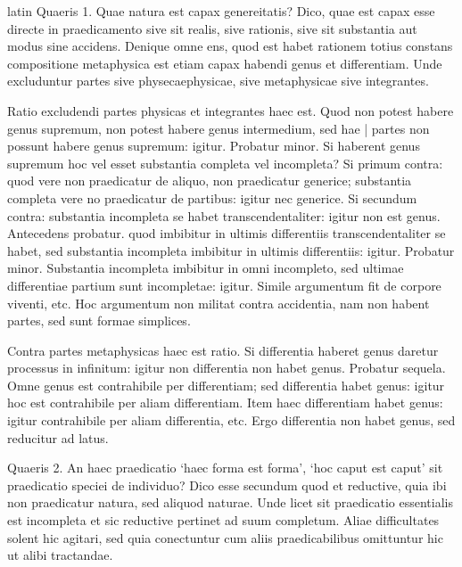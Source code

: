 \begin{otherlanguage*}{latin}
\pstart
Quaeris 1. Quae natura est capax genereitatis? Dico, quae est capax esse directe in praedicamento sive sit realis, sive rationis, sive sit substantia aut modus sine accidens. Denique omne ens, quod est habet rationem totius constans compositione metaphysica est etiam capax habendi genus et differentiam. Unde excluduntur partes sive physecaephysicae, sive metaphysicae sive integrantes. 
\pend

\pstart
Ratio excludendi partes physicas et integrantes haec est. Quod non potest habere genus supremum, non potest habere genus intermedium, sed hae \textnormal{|} partes non possunt habere genus supremum:
igitur. Probatur minor. Si haberent genus supremum hoc vel esset substantia completa vel incompleta? Si primum contra:
quod vere non praedicatur de aliquo, non praedicatur generice; substantia completa vere no praedicatur de partibus:
igitur nec generice. Si secundum contra:
substantia incompleta se habet transcendentaliter:
igitur non est genus. Antecedens probatur. quod imbibitur in ultimis differentiis transcendentaliter se habet, sed substantia incompleta imbibitur in ultimis differentiis:
igitur. Probatur minor. Substantia incompleta imbibitur in omni incompleto, sed ultimae differentiae partium sunt incompletae:
igitur. Simile argumentum fit de corpore viventi, etc. Hoc argumentum non militat contra accidentia, nam non habent partes, sed sunt formae simplices. 
\pend

\pstart
Contra partes metaphysicas haec est ratio. Si differentia haberet genus daretur processus in infinitum:
igitur non differentia non habet genus. Probatur sequela. Omne genus est contrahibile per differentiam; sed differentia habet genus:
igitur hoc est contrahibile per aliam differentiam. Item haec differentiam habet genus:
igitur contrahibile per aliam differentia, etc. Ergo differentia non habet genus, sed reducitur ad latus. 
\pend

\pstart
Quaeris 2. An haec praedicatio `haec forma est forma', `hoc caput est caput' sit praedicatio speciei de individuo? Dico esse secundum quod et reductive, quia ibi non praedicatur natura, sed aliquod naturae. Unde licet sit praedicatio essentialis est incompleta et sic reductive pertinet ad suum completum. Aliae difficultates solent hic agitari, sed quia conectuntur cum aliis praedicabilibus omittuntur hic ut alibi tractandae. 
\pend

\pstart
{}
\pend


\end{otherlanguage*}
